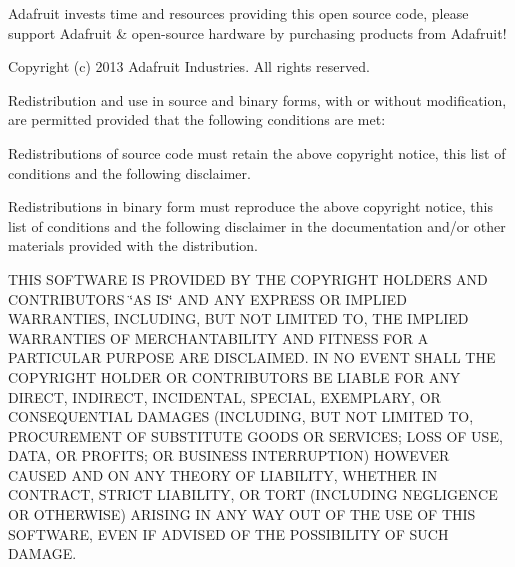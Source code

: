 Adafruit invests time and resources providing this open source code, please support Adafruit \& open-\/source hardware by purchasing products from Adafruit!

Copyright (c) 2013 Adafruit Industries. All rights reserved.

Redistribution and use in source and binary forms, with or without modification, are permitted provided that the following conditions are met\-:


\begin{DoxyItemize}
\item Redistributions of source code must retain the above copyright notice, this list of conditions and the following disclaimer.
\item Redistributions in binary form must reproduce the above copyright notice, this list of conditions and the following disclaimer in the documentation and/or other materials provided with the distribution.
\end{DoxyItemize}

T\-H\-I\-S S\-O\-F\-T\-W\-A\-R\-E I\-S P\-R\-O\-V\-I\-D\-E\-D B\-Y T\-H\-E C\-O\-P\-Y\-R\-I\-G\-H\-T H\-O\-L\-D\-E\-R\-S A\-N\-D C\-O\-N\-T\-R\-I\-B\-U\-T\-O\-R\-S \char`\"{}\-A\-S I\-S\char`\"{} A\-N\-D A\-N\-Y E\-X\-P\-R\-E\-S\-S O\-R I\-M\-P\-L\-I\-E\-D W\-A\-R\-R\-A\-N\-T\-I\-E\-S, I\-N\-C\-L\-U\-D\-I\-N\-G, B\-U\-T N\-O\-T L\-I\-M\-I\-T\-E\-D T\-O, T\-H\-E I\-M\-P\-L\-I\-E\-D W\-A\-R\-R\-A\-N\-T\-I\-E\-S O\-F M\-E\-R\-C\-H\-A\-N\-T\-A\-B\-I\-L\-I\-T\-Y A\-N\-D F\-I\-T\-N\-E\-S\-S F\-O\-R A P\-A\-R\-T\-I\-C\-U\-L\-A\-R P\-U\-R\-P\-O\-S\-E A\-R\-E D\-I\-S\-C\-L\-A\-I\-M\-E\-D. I\-N N\-O E\-V\-E\-N\-T S\-H\-A\-L\-L T\-H\-E C\-O\-P\-Y\-R\-I\-G\-H\-T H\-O\-L\-D\-E\-R O\-R C\-O\-N\-T\-R\-I\-B\-U\-T\-O\-R\-S B\-E L\-I\-A\-B\-L\-E F\-O\-R A\-N\-Y D\-I\-R\-E\-C\-T, I\-N\-D\-I\-R\-E\-C\-T, I\-N\-C\-I\-D\-E\-N\-T\-A\-L, S\-P\-E\-C\-I\-A\-L, E\-X\-E\-M\-P\-L\-A\-R\-Y, O\-R C\-O\-N\-S\-E\-Q\-U\-E\-N\-T\-I\-A\-L D\-A\-M\-A\-G\-E\-S (I\-N\-C\-L\-U\-D\-I\-N\-G, B\-U\-T N\-O\-T L\-I\-M\-I\-T\-E\-D T\-O, P\-R\-O\-C\-U\-R\-E\-M\-E\-N\-T O\-F S\-U\-B\-S\-T\-I\-T\-U\-T\-E G\-O\-O\-D\-S O\-R S\-E\-R\-V\-I\-C\-E\-S; L\-O\-S\-S O\-F U\-S\-E, D\-A\-T\-A, O\-R P\-R\-O\-F\-I\-T\-S; O\-R B\-U\-S\-I\-N\-E\-S\-S I\-N\-T\-E\-R\-R\-U\-P\-T\-I\-O\-N) H\-O\-W\-E\-V\-E\-R C\-A\-U\-S\-E\-D A\-N\-D O\-N A\-N\-Y T\-H\-E\-O\-R\-Y O\-F L\-I\-A\-B\-I\-L\-I\-T\-Y, W\-H\-E\-T\-H\-E\-R I\-N C\-O\-N\-T\-R\-A\-C\-T, S\-T\-R\-I\-C\-T L\-I\-A\-B\-I\-L\-I\-T\-Y, O\-R T\-O\-R\-T (I\-N\-C\-L\-U\-D\-I\-N\-G N\-E\-G\-L\-I\-G\-E\-N\-C\-E O\-R O\-T\-H\-E\-R\-W\-I\-S\-E) A\-R\-I\-S\-I\-N\-G I\-N A\-N\-Y W\-A\-Y O\-U\-T O\-F T\-H\-E U\-S\-E O\-F T\-H\-I\-S S\-O\-F\-T\-W\-A\-R\-E, E\-V\-E\-N I\-F A\-D\-V\-I\-S\-E\-D O\-F T\-H\-E P\-O\-S\-S\-I\-B\-I\-L\-I\-T\-Y O\-F S\-U\-C\-H D\-A\-M\-A\-G\-E. 

